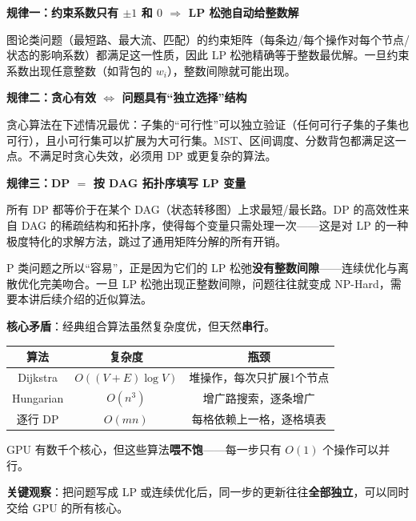 \documentclass[12pt, a4paper]{ctexart}
\begin{document}
\begin{blackboard}[三条核心规律]

\textbf{规律一：约束系数只有 $\pm 1$ 和 $0$ $\Rightarrow$ LP 松弛自动给整数解}

图论类问题（最短路、最大流、匹配）的约束矩阵（每条边/每个操作对每个节点/状态的影响系数）都满足这一性质，因此 LP 松弛精确等于整数最优解。一旦约束系数出现任意整数（如背包的 $w_i$），整数间隙就可能出现。

\textbf{规律二：贪心有效 $\Leftrightarrow$ 问题具有``独立选择''结构}

贪心算法在下述情况最优：子集的``可行性''可以独立验证（任何可行子集的子集也可行），且小可行集可以扩展为大可行集。MST、区间调度、分数背包都满足这一点。不满足时贪心失效，必须用 DP 或更复杂的算法。

\textbf{规律三：DP $=$ 按 DAG 拓扑序填写 LP 变量}

所有 DP 都等价于在某个 DAG（状态转移图）上求最短/最长路。DP 的高效性来自 DAG 的稀疏结构和拓扑序，使得每个变量只需处理一次——这是对 LP 的一种极度特化的求解方法，跳过了通用矩阵分解的所有开销。

\begin{insight}[P vs NP 的凸优化本质]
P 类问题之所以``容易''，正是因为它们的 LP 松弛\textbf{没有整数间隙}——连续优化与离散优化完美吻合。一旦 LP 松弛出现正整数间隙，问题往往就变成 NP-Hard，需要本讲后续介绍的近似算法。
\end{insight}

\end{blackboard}


\begin{blackboard}

\textbf{核心矛盾}：经典组合算法虽然复杂度优，但天然\textbf{串行}。

\begin{center}
\begin{tabular}{c|c|c}
算法 & 复杂度 & 瓶颈 \\
\hline
Dijkstra & $O((V+E)\log V)$ & 堆操作，每次只扩展1个节点 \\
Hungarian & $O(n^3)$ & 增广路搜索，逐条增广 \\
逐行 DP & $O(mn)$ & 每格依赖上一格，逐格填表
\end{tabular}
\end{center}

GPU 有数千个核心，但这些算法\textbf{喂不饱}——每一步只有 $O(1)$ 个操作可以并行。

\textbf{关键观察}：把问题写成 LP 或连续优化后，同一步的更新往往\textbf{全部独立}，可以同时交给 GPU 的所有核心。

\end{blackboard}
\end{document}
